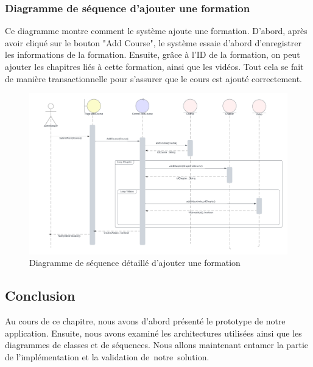 \subsubsection*{Diagramme de séquence d’ajouter une formation}

Ce diagramme montre comment le système ajoute une formation. D'abord, après avoir cliqué sur le bouton "Add Course", le système essaie d'abord d'enregistrer les informations de la formation. Ensuite, grâce à l'ID de la formation, on peut ajouter les chapitres liés à cette formation, ainsi que les vidéos. Tout cela se fait de manière transactionnelle pour s'assurer que le cours est ajouté correctement. 

\begin{figure}[H]
    \centering
    \includegraphics[width=19cm]{Figures/addcourseSequence.png}
    \caption{Diagramme de séquence détaillé d’ajouter une formation}
\end{figure}
\newpage
\subsection*{Conclusion}
Au cours de ce chapitre, nous avons d'abord présenté le prototype de notre application. Ensuite, nous avons examiné les architectures utilisées ainsi que les diagrammes de classes et de séquences. Nous allons maintenant entamer la partie de l'implémentation et la validation de notre solution.
